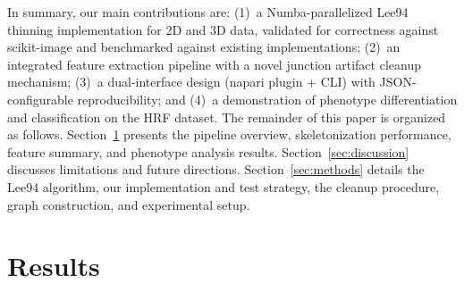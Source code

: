 \documentclass[11pt]{article}
\begin{document}
In summary, our main contributions are: (1)~a Numba-parallelized
Lee94 thinning implementation for 2D and 3D data, validated for
correctness against scikit-image and benchmarked against existing
implementations; (2)~an integrated feature extraction pipeline with a
novel junction artifact cleanup mechanism; (3)~a dual-interface
design (napari plugin + CLI) with JSON-configurable reproducibility;
and (4)~a demonstration of phenotype differentiation and
classification on the HRF dataset. The remainder of this paper is
organized as follows. Section~\ref{sec:results} presents the pipeline
overview, skeletonization performance, feature summary, and phenotype
analysis results. Section~\ref{sec:discussion} discusses limitations
and future directions. Section~\ref{sec:methods} details the Lee94
algorithm, our implementation and test strategy, the cleanup
procedure, graph construction, and experimental setup.

\section{Results}\label{sec:results}
\end{document}
